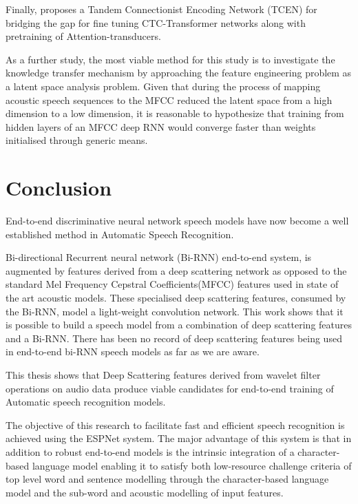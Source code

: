 Finally, \cite{wang2019bridging} proposes a Tandem Connectionist Encoding Network (TCEN) for bridging the gap for fine tuning CTC-Transformer networks along with pretraining of Attention-transducers.

As a further study, the most viable method for this study is to investigate the knowledge transfer mechanism by approaching the feature engineering problem as a latent space analysis problem.  Given that during the process of mapping acoustic speech sequences to the MFCC reduced the latent space from a high dimension to a low dimension, it is reasonable to hypothesize that training from hidden layers of an MFCC deep RNN would converge faster than weights initialised through generic means.

\section{Conclusion}
End-to-end discriminative neural network speech models have now become a well established method in Automatic Speech Recognition. 

Bi-directional Recurrent neural network (Bi-RNN) end-to-end system, is augmented by features derived from a deep scattering network as opposed to the standard Mel Frequency Cepstral Coefficients(MFCC) features used in state of the art acoustic models.  These specialised deep scattering features, consumed by the Bi-RNN, model a light-weight convolution network. This work shows that it is possible to build a speech model from a combination of deep scattering features and a Bi-RNN. There has been no record of deep scattering features being used in end-to-end bi-RNN speech models as far as we are aware.  

This thesis shows that Deep Scattering features derived from wavelet filter operations on audio data produce viable candidates for end-to-end training of Automatic speech recognition models.

The objective of this research to facilitate fast and efficient speech recognition is achieved using the ESPNet system.  The major advantage of this system is that in addition to robust end-to-end models is the intrinsic integration of a character-based language model enabling it to satisfy both low-resource challenge criteria of top level word and sentence modelling through the character-based language model and the sub-word and acoustic modelling of input features.
